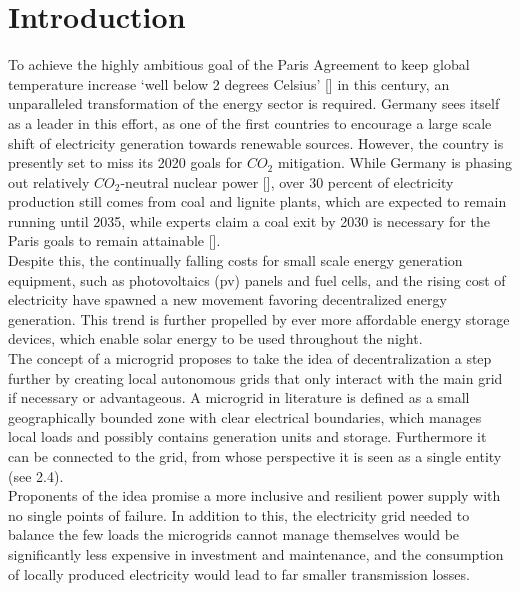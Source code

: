 \documentclass[
	11pt,								%
	DIV10,								%
	a4paper,         					%
	oneside,							%
	headheight=20pt,					%
	footheight=20pt,					%
    parskip=full,						%
    listof=totoc,						%
	bibliography=totoc,					%
	index=totoc,						%
]{scrartcl}
\begin{document}




\section{Introduction}
To achieve the highly ambitious goal of the Paris Agreement to keep global temperature increase `well below 2 degrees Celsius' [\cite{ParisAgreement2018}] in this century, an unparalleled transformation of the energy sector is required. Germany sees itself as a leader in this effort, as one of the first countries to encourage a large scale shift of electricity generation towards renewable sources. However, the country is presently set to miss its 2020 goals for $CO_2$ mitigation. While Germany is phasing out relatively $CO_2$-neutral nuclear power [\cite{NuclearPowerGermany2019}], over 30 percent of electricity production still comes from coal and lignite plants, which are expected to remain running until 2035, while experts claim a coal exit by 2030 is necessary for the Paris goals to remain attainable [\cite{yanguasparraScienceBasedCoal2018}].
\\
Despite this, the continually falling costs for small scale energy generation equipment, such as photovoltaics (pv) panels and fuel cells, and the rising cost of electricity have spawned a new movement favoring decentralized energy generation. This trend is further propelled by ever more affordable energy storage devices, which enable solar energy to be used throughout the night.
\\
The concept of a microgrid proposes to take the idea of decentralization a step further by creating local autonomous grids that only interact with the main grid if necessary or advantageous.
A microgrid in literature is defined as a small geographically bounded zone with clear electrical boundaries, which manages local loads and possibly contains generation units and storage. Furthermore it can be connected to the grid, from whose perspective it is seen as a single entity (see 2.4). \\
Proponents of the idea promise a more inclusive and resilient power supply with no single points of failure. In addition to this, the electricity grid needed to balance the few loads the microgrids cannot manage themselves would be significantly less expensive in investment and maintenance, and the consumption of locally produced electricity would lead to far smaller transmission losses.
\end{document}
